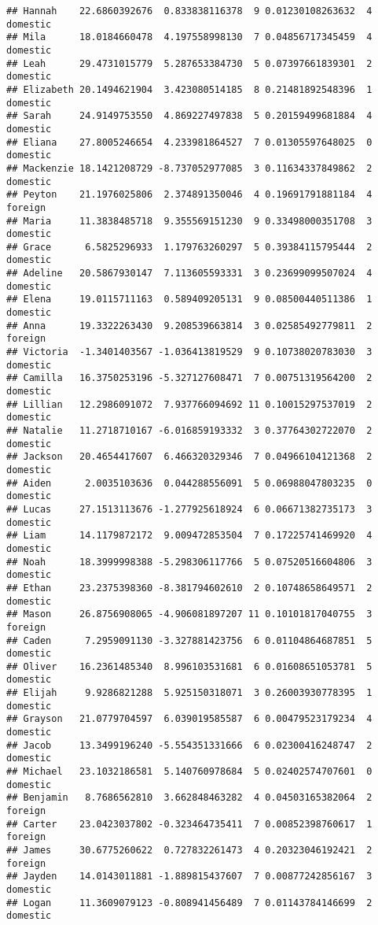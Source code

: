 \documentclass[
]{article}
\begin{document}
\begin{verbatim}
## Hannah    22.6860392676  0.833838116378  9 0.01230108263632  4 domestic
## Mila      18.0184660478  4.197558998130  7 0.04856717345459  4 domestic
## Leah      29.4731015779  5.287653384730  5 0.07397661839301  2 domestic
## Elizabeth 20.1494621904  3.423080514185  8 0.21481892548396  1 domestic
## Sarah     24.9149753550  4.869227497838  5 0.20159499681884  4 domestic
## Eliana    27.8005246654  4.233981864527  7 0.01305597648025  0 domestic
## Mackenzie 18.1421208729 -8.737052977085  3 0.11634337849862  2 domestic
## Peyton    21.1976025806  2.374891350046  4 0.19691791881184  4  foreign
## Maria     11.3838485718  9.355569151230  9 0.33498000351708  3 domestic
## Grace      6.5825296933  1.179763260297  5 0.39384115795444  2 domestic
## Adeline   20.5867930147  7.113605593331  3 0.23699099507024  4 domestic
## Elena     19.0115711163  0.589409205131  9 0.08500440511386  1 domestic
## Anna      19.3322263430  9.208539663814  3 0.02585492779811  2  foreign
## Victoria  -1.3401403567 -1.036413819529  9 0.10738020783030  3 domestic
## Camilla   16.3750253196 -5.327127608471  7 0.00751319564200  2 domestic
## Lillian   12.2986091072  7.937766094692 11 0.10015297537019  2 domestic
## Natalie   11.2718710167 -6.016859193332  3 0.37764302722070  2 domestic
## Jackson   20.4654417607  6.466320329346  7 0.04966104121368  2 domestic
## Aiden      2.0035103636  0.044288556091  5 0.06988047803235  0 domestic
## Lucas     27.1513113676 -1.277925618924  6 0.06671382735173  3 domestic
## Liam      14.1179872172  9.009472853504  7 0.17225741469920  4 domestic
## Noah      18.3999998388 -5.298306117766  5 0.07520516604806  3 domestic
## Ethan     23.2375398360 -8.381794602610  2 0.10748658649571  2 domestic
## Mason     26.8756908065 -4.906081897207 11 0.10101817040755  3  foreign
## Caden      7.2959091130 -3.327881423756  6 0.01104864687851  5 domestic
## Oliver    16.2361485340  8.996103531681  6 0.01608651053781  5 domestic
## Elijah     9.9286821288  5.925150318071  3 0.26003930778395  1 domestic
## Grayson   21.0779704597  6.039019585587  6 0.00479523179234  4 domestic
## Jacob     13.3499196240 -5.554351331666  6 0.02300416248747  2 domestic
## Michael   23.1032186581  5.140760978684  5 0.02402574707601  0 domestic
## Benjamin   8.7686562810  3.662848463282  4 0.04503165382064  2  foreign
## Carter    23.0423037802 -0.323464735411  7 0.00852398760617  1  foreign
## James     30.6775260622  0.727832261473  4 0.20323046192421  2  foreign
## Jayden    14.0143011881 -1.889815437607  7 0.00877242856167  3 domestic
## Logan     11.3609079123 -0.808941456489  7 0.01143784146699  2 domestic

\end{verbatim}
\end{document}
